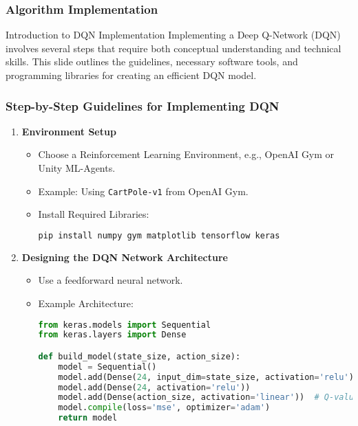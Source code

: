 \documentclass{beamer}
\begin{document}
\begin{frame}
    \frametitle{Algorithm Implementation}
    \begin{block}{Introduction to DQN Implementation}
        Implementing a Deep Q-Network (DQN) involves several steps that require both conceptual understanding and technical skills. This slide outlines the guidelines, necessary software tools, and programming libraries for creating an efficient DQN model.
    \end{block}
\end{frame}

\begin{frame}[fragile]
    \frametitle{Step-by-Step Guidelines for Implementing DQN}

    \begin{enumerate}
        \item \textbf{Environment Setup}
        \begin{itemize}
            \item Choose a Reinforcement Learning Environment, e.g., OpenAI Gym or Unity ML-Agents.
            \item Example: Using \texttt{CartPole-v1} from OpenAI Gym.
            \item Install Required Libraries:
            \begin{lstlisting}[language=bash]
pip install numpy gym matplotlib tensorflow keras
            \end{lstlisting}
        \end{itemize}

        \item \textbf{Designing the DQN Network Architecture}
        \begin{itemize}
            \item Use a feedforward neural network.
            \item Example Architecture:
            \begin{lstlisting}[language=python]
from keras.models import Sequential
from keras.layers import Dense

def build_model(state_size, action_size):
    model = Sequential()
    model.add(Dense(24, input_dim=state_size, activation='relu'))
    model.add(Dense(24, activation='relu'))
    model.add(Dense(action_size, activation='linear'))  # Q-values
    model.compile(loss='mse', optimizer='adam')
    return model
            \end{lstlisting}
        \end{itemize}
    \end{enumerate}
\end{frame}
\end{document}
